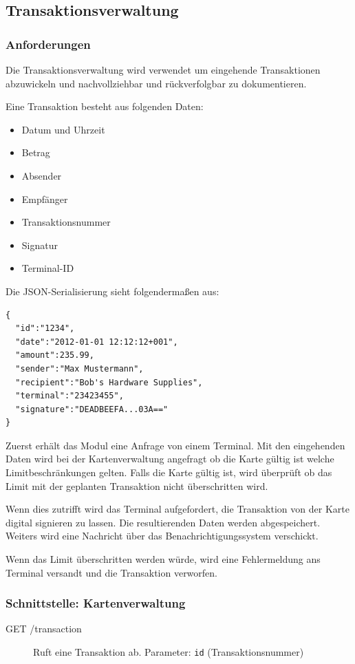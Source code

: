 \documentclass[12pt,a4paper,titlepage,oneside]{scrartcl}
\begin{document}
\subsection{Transaktionsverwaltung}
\subsubsection{Anforderungen}

Die Transaktionsverwaltung wird verwendet um eingehende Transaktionen abzuwickeln
und nachvollziehbar und rückverfolgbar zu dokumentieren.

Eine Transaktion besteht aus folgenden Daten:
\begin{itemize}
	\item Datum und Uhrzeit
	\item Betrag
	\item Absender
	\item Empfänger
	\item Transaktionsnummer
	\item Signatur
	\item Terminal-ID
\end{itemize}

Die JSON-Serialisierung sieht folgendermaßen aus:
\begin{lstlisting}
{
  "id":"1234",
  "date":"2012-01-01 12:12:12+001",
  "amount":235.99,
  "sender":"Max Mustermann",
  "recipient":"Bob's Hardware Supplies",
  "terminal":"23423455",
  "signature":"DEADBEEFA...03A=="
}
\end{lstlisting}

Zuerst erhält das Modul eine Anfrage von einem Terminal. Mit den eingehenden Daten wird bei der Kartenverwaltung angefragt ob die Karte gültig ist welche Limitbeschränkungen gelten. Falls die Karte gültig ist, wird überprüft ob das Limit mit der geplanten Transaktion nicht überschritten wird.

Wenn dies zutrifft wird das Terminal aufgefordert, die Transaktion von der Karte digital
signieren zu lassen. Die resultierenden Daten werden abgespeichert.
Weiters wird eine Nachricht über das Benachrichtigungssystem verschickt.

Wenn das Limit überschritten werden würde, wird eine Fehlermeldung ans Terminal
versandt und die Transaktion verworfen.

\subsubsection{Schnittstelle: Kartenverwaltung}
\begin{description}
	\item[GET /transaction]
		Ruft eine Transaktion ab. Parameter: \texttt{id} (Transaktionsnummer)
\end{description}
\end{document}
